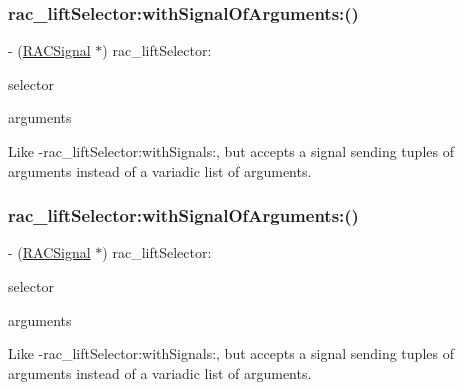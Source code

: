 \subsubsection{\texorpdfstring{rac\+\_\+lift\+Selector\+:with\+Signal\+Of\+Arguments\+:()}{rac\_liftSelector:withSignalOfArguments:()}\hspace{0.1cm}{\footnotesize\ttfamily [2/3]}}
{\footnotesize\ttfamily -\/ (\mbox{\hyperlink{interface_r_a_c_signal}{R\+A\+C\+Signal}} $\ast$) rac\+\_\+lift\+Selector\+: \begin{DoxyParamCaption}\item[{(S\+EL)}]{selector }\item[{withSignalOfArguments:(\mbox{\hyperlink{interface_r_a_c_signal}{R\+A\+C\+Signal}} $\ast$)}]{arguments }\end{DoxyParamCaption}}

Like -\/rac\+\_\+lift\+Selector\+:with\+Signals\+:, but accepts a signal sending tuples of arguments instead of a variadic list of arguments. \mbox{\label{category_n_s_object_07_r_a_c_lifting_08_a7c413bf6dc3325f77c93998b90cec8ab}} 
\subsubsection{\texorpdfstring{rac\+\_\+lift\+Selector\+:with\+Signal\+Of\+Arguments\+:()}{rac\_liftSelector:withSignalOfArguments:()}\hspace{0.1cm}{\footnotesize\ttfamily [3/3]}}
{\footnotesize\ttfamily -\/ (\mbox{\hyperlink{interface_r_a_c_signal}{R\+A\+C\+Signal}} $\ast$) rac\+\_\+lift\+Selector\+: \begin{DoxyParamCaption}\item[{(S\+EL)}]{selector }\item[{withSignalOfArguments:(\mbox{\hyperlink{interface_r_a_c_signal}{R\+A\+C\+Signal}} $\ast$)}]{arguments }\end{DoxyParamCaption}}

Like -\/rac\+\_\+lift\+Selector\+:with\+Signals\+:, but accepts a signal sending tuples of arguments instead of a variadic list of arguments. \mbox{\label{category_n_s_object_07_r_a_c_lifting_08_a96e6785219ad9772ad33c39dbd7c69a2}} 

